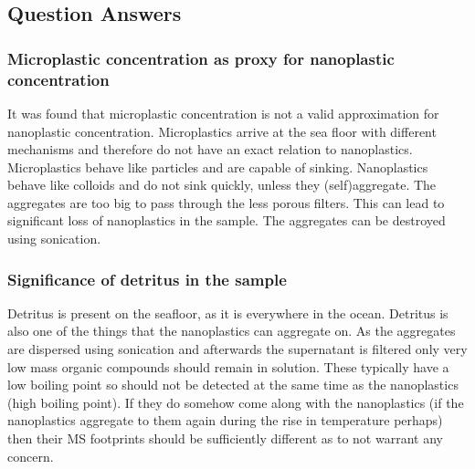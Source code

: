 \documentclass[twocolumn,a4paper,aps,amsmath,amssymb,floatfix,superscriptaddress]{revtex4-2}
\begin{document}
	\subsection{Question Answers}
	\subsubsection{}
	
	\subsubsection{}
	
	\subsubsection{Microplastic concentration as proxy for nanoplastic concentration}
	It was found that microplastic concentration is not a valid approximation for nanoplastic concentration. Microplastics arrive at the sea floor with different mechanisms and therefore do not have an exact relation to nanoplastics. \cite{Vertical flux of microplastic} \cite{MP in Atlantic deep waters} Microplastics behave like particles and are capable of sinking. Nanoplastics behave like colloids and do not sink quickly, unless they (self)aggregate. \cite{Aggregation of NP, what we know} The aggregates are too big to pass through the less porous filters. This can lead to significant loss of nanoplastics in the sample. The aggregates can be destroyed using sonication. \cite{Heteroaggregation, disaggregation} 
	\subsubsection{Significance of detritus in the sample}
	Detritus is present on the seafloor, as it is everywhere in the ocean. Detritus is also one of the things that the nanoplastics can aggregate on. As the aggregates are dispersed using sonication and afterwards the supernatant is filtered only very low mass organic compounds should remain in solution. These typically have a low boiling point so should not be detected at the same time as the nanoplastics (high boiling point). \cite{McMurry} If they do somehow come along with the nanoplastics (if the nanoplastics aggregate to them again during the rise in temperature perhaps) then their MS footprints should be sufficiently different as to not warrant any concern.
\end{document}
